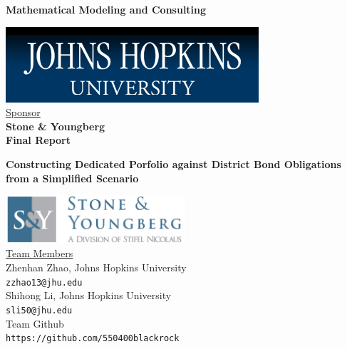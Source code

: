 \documentclass[oneside,12pt]{report}
\begin{document}
\def\thefootnote{\fnsymbol{footnote}}

\thispagestyle{empty}

\def\shiftdowna{0.32in}  %
\def\shiftdownb{0.22in}  %


\begin{center}
\textbf{{\large Mathematical Modeling and Consulting }}\\

\vspace \shiftdowna

 \includegraphics{jhu.png}\\


\vspace \shiftdowna
\underline {Sponsor}\\ 
\vspace{5pt}
\textbf{\large Stone \& Youngberg} \\
\vspace\shiftdowna
\textbf{{Final Report}}

\vspace \shiftdowna
\textbf{{\Large Constructing Dedicated Porfolio against District Bond Obligations from a Simplified Scenario}}

\vspace \shiftdowna
\includegraphics[width=0.5\textwidth]{stone.jpeg}\\
\vspace{0.35in}
\underline {Team Members}\\
\vspace{5pt}
Zhenhan Zhao, Johns Hopkins University\\
\texttt{zzhao13@jhu.edu} \\
\vspace{10pt}
Shihong Li, Johns Hopkins University\\
\texttt{sli50@jhu.edu}\\
\vspace{10pt}
Team Github \\
\texttt{https://github.com/550400blackrock}


\end{center}
\end{document}
